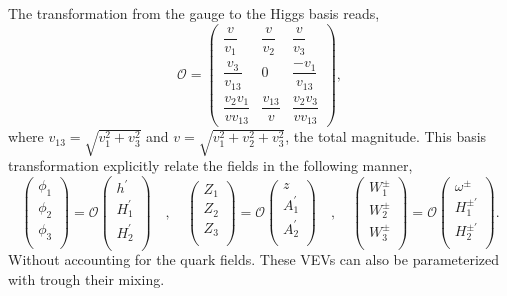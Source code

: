 The transformation from the gauge to the Higgs basis reads, 
\begin{equation}
\mathcal{O} = 
\begin{pmatrix}
\dfrac{v}{v_1} & \dfrac{v}{v_2}  & \dfrac{v}{v_3} \\[1.2em]
\dfrac{v_3}{v_{13}} & 0 & \dfrac{-v_1}{v_{13}} \\[1.2em]
\dfrac{v_2 v_1}{v v_{13}}  & \dfrac{v_{13}}{v} & \dfrac{v_2 v_3}{v v_{13}}  
\end{pmatrix} , 
\end{equation}
%
where $v_{13}=\sqrt{v_1^2 + v_3^2}$ and $v=\sqrt{v_1^2 + v_2^2 + v_3^2 }$, the total magnitude. This basis transformation explicitly relate the fields in the following manner, 
%
\begin{equation}
\begin{pmatrix}
\phi_1 \\
\phi_2 \\
\phi_3 \\
\end{pmatrix} = 
\mathcal{O} \begin{pmatrix}
h^\prime \\
H_1^\prime \\
H_2^\prime \\
\end{pmatrix} 
%
\quad , \quad 
%
\begin{pmatrix}
Z_1 \\
Z_2 \\
Z_3 \\
\end{pmatrix} = 
\mathcal{O} \begin{pmatrix}
z \\
A_1^\prime  \\
A_2^\prime  \\
\end{pmatrix} 
%
\quad , \quad 
%
\begin{pmatrix}
W_1^\pm  \\
W_2^\pm  \\
W_3^\pm  \\
\end{pmatrix} = 
\mathcal{O} \begin{pmatrix}
\omega^\pm \\
H_1^{\pm \prime}  \\
H_2^{\pm \prime}  \\
\end{pmatrix} . 
\end{equation}
%
Without accounting for the quark fields. These VEVs can also be parameterized with trough their mixing. 
